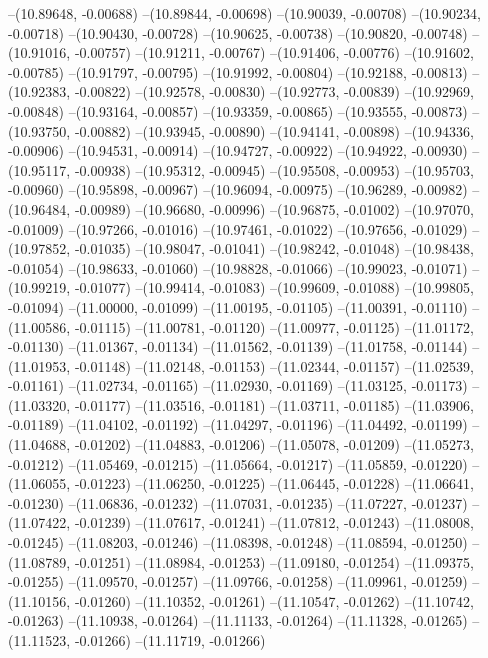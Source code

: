 --(10.89648, -0.00688)
--(10.89844, -0.00698)
--(10.90039, -0.00708)
--(10.90234, -0.00718)
--(10.90430, -0.00728)
--(10.90625, -0.00738)
--(10.90820, -0.00748)
--(10.91016, -0.00757)
--(10.91211, -0.00767)
--(10.91406, -0.00776)
--(10.91602, -0.00785)
--(10.91797, -0.00795)
--(10.91992, -0.00804)
--(10.92188, -0.00813)
--(10.92383, -0.00822)
--(10.92578, -0.00830)
--(10.92773, -0.00839)
--(10.92969, -0.00848)
--(10.93164, -0.00857)
--(10.93359, -0.00865)
--(10.93555, -0.00873)
--(10.93750, -0.00882)
--(10.93945, -0.00890)
--(10.94141, -0.00898)
--(10.94336, -0.00906)
--(10.94531, -0.00914)
--(10.94727, -0.00922)
--(10.94922, -0.00930)
--(10.95117, -0.00938)
--(10.95312, -0.00945)
--(10.95508, -0.00953)
--(10.95703, -0.00960)
--(10.95898, -0.00967)
--(10.96094, -0.00975)
--(10.96289, -0.00982)
--(10.96484, -0.00989)
--(10.96680, -0.00996)
--(10.96875, -0.01002)
--(10.97070, -0.01009)
--(10.97266, -0.01016)
--(10.97461, -0.01022)
--(10.97656, -0.01029)
--(10.97852, -0.01035)
--(10.98047, -0.01041)
--(10.98242, -0.01048)
--(10.98438, -0.01054)
--(10.98633, -0.01060)
--(10.98828, -0.01066)
--(10.99023, -0.01071)
--(10.99219, -0.01077)
--(10.99414, -0.01083)
--(10.99609, -0.01088)
--(10.99805, -0.01094)
--(11.00000, -0.01099)
--(11.00195, -0.01105)
--(11.00391, -0.01110)
--(11.00586, -0.01115)
--(11.00781, -0.01120)
--(11.00977, -0.01125)
--(11.01172, -0.01130)
--(11.01367, -0.01134)
--(11.01562, -0.01139)
--(11.01758, -0.01144)
--(11.01953, -0.01148)
--(11.02148, -0.01153)
--(11.02344, -0.01157)
--(11.02539, -0.01161)
--(11.02734, -0.01165)
--(11.02930, -0.01169)
--(11.03125, -0.01173)
--(11.03320, -0.01177)
--(11.03516, -0.01181)
--(11.03711, -0.01185)
--(11.03906, -0.01189)
--(11.04102, -0.01192)
--(11.04297, -0.01196)
--(11.04492, -0.01199)
--(11.04688, -0.01202)
--(11.04883, -0.01206)
--(11.05078, -0.01209)
--(11.05273, -0.01212)
--(11.05469, -0.01215)
--(11.05664, -0.01217)
--(11.05859, -0.01220)
--(11.06055, -0.01223)
--(11.06250, -0.01225)
--(11.06445, -0.01228)
--(11.06641, -0.01230)
--(11.06836, -0.01232)
--(11.07031, -0.01235)
--(11.07227, -0.01237)
--(11.07422, -0.01239)
--(11.07617, -0.01241)
--(11.07812, -0.01243)
--(11.08008, -0.01245)
--(11.08203, -0.01246)
--(11.08398, -0.01248)
--(11.08594, -0.01250)
--(11.08789, -0.01251)
--(11.08984, -0.01253)
--(11.09180, -0.01254)
--(11.09375, -0.01255)
--(11.09570, -0.01257)
--(11.09766, -0.01258)
--(11.09961, -0.01259)
--(11.10156, -0.01260)
--(11.10352, -0.01261)
--(11.10547, -0.01262)
--(11.10742, -0.01263)
--(11.10938, -0.01264)
--(11.11133, -0.01264)
--(11.11328, -0.01265)
--(11.11523, -0.01266)
--(11.11719, -0.01266)
